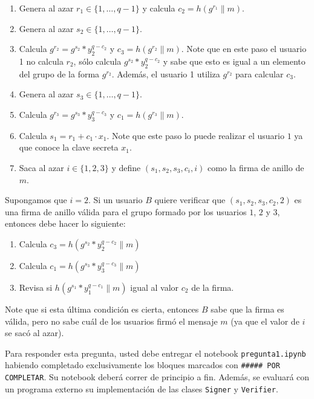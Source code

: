 \begin{enumerate}
\item Genera al azar $r_1 \in \{1, \ldots, q-1\}$ y calcula $c_2 = h(g^{r_1} \| m)$.

\item Genera al azar $s_2 \in \{1, \ldots, q-1\}$.

\item Calcula $g^{r_2} = g^{s_2} * y_2^{q - c_2}$ y $c_3 = h(g^{r_2} \| m)$. Note que en este paso el usuario 1 no calcula $r_2$, sólo calcula $g^{s_2} * y_2^{q - c_2}$ y sabe que esto es igual a un elemento del grupo de la forma $g^{r_2}$. Además, el usuario 1 utiliza $g^{r_2}$ para calcular $c_3$.

\item Genera al azar $s_3 \in \{1, \ldots, q-1\}$.

\item Calcula $g^{r_3} = g^{s_3} * y_3^{q - c_3}$ y $c_1 = h(g^{r_3} \| m)$.

\item Calcula $s_1 = r_1 + c_1 \cdot x_1$. Note que este paso lo puede realizar el usuario $1$ ya que conoce la clave secreta $x_1$.

\item Saca al azar $i\in\{1,2,3\}$ y define $(s_1, s_2, s_3, c_i, i)$ como la firma de anillo de $m$.
\end{enumerate} 
Supongamos que $i=2$. Si un usuario $B$ quiere verificar que $(s_1, s_2, s_3, c_2, 2)$ es una firma de anillo válida para el grupo
formado por los usuarios $1$, $2$ y $3$, entonces debe hacer lo siguiente:

\begin{enumerate}
	\item Calcula $c_3=h(g^{s_2} * y_2^{q - c_2} \| m)$
	\item Calcula $c_1=h(g^{s_3} * y_3^{q - c_3} \| m)$
	\item Revisa si $h(g^{s_1} * y_1^{q - c_1} \| m)$ igual al valor $c_2$ de la firma.
\end{enumerate}
Note que si esta última condición es cierta, entonces $B$ sabe
que la firma es válida, pero no sabe cuál de los usuarios firmó el
mensaje $m$ (ya que el valor de $i$ se sacó al azar).

Para responder esta pregunta, usted debe entregar el notebook \texttt{pregunta1.ipynb} habiendo completado exclusivamente los bloques marcados con \texttt{\#\#\#\#\# POR COMPLETAR}. Su notebook deberá correr de principio a fin. Además, se evaluará con un programa externo su implementación de las clases \texttt{Signer} y \texttt{Verifier}.
